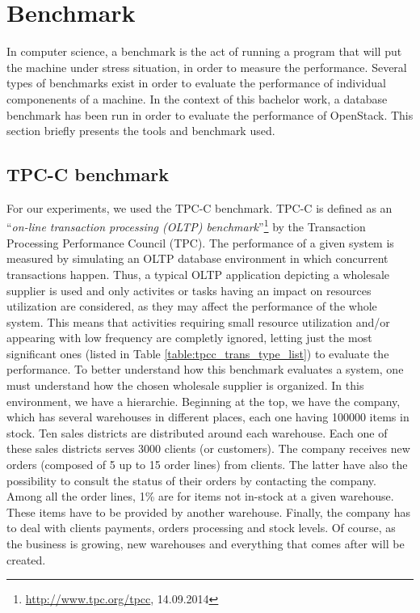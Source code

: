 

\chapter{Benchmark}
In computer science, a benchmark is the act of running a program that will put the machine under stress situation, in order to measure the performance. 
Several types of benchmarks exist in order to evaluate the performance of individual componenents of a machine. 
In the context of this bachelor work, a database benchmark has been run in order to evaluate the performance of OpenStack.
This section briefly presents the tools and benchmark used.

\section{TPC-C benchmark}
For our experiments, we used the TPC-C benchmark. 
TPC-C is defined as an \enquote{\textit{on-line transaction processing (OLTP) benchmark}}\footnote{\url{http://www.tpc.org/tpcc}, 14.09.2014} by the Transaction Processing Performance Council (TPC).
The performance of a given system is measured by simulating an OLTP database environment in which concurrent transactions happen.
Thus, a typical OLTP application depicting a wholesale supplier is used 
and only activites or tasks having an impact on resources utilization are considered, as they may affect the performance of the whole system.
This means that activities requiring small resource utilization and/or appearing with low frequency are completly ignored, 
letting just the most significant ones (listed in Table \ref{table:tpcc_trans_type_list}) to evaluate the performance.
To better understand how this benchmark evaluates a system, one must understand how the chosen wholesale supplier is organized.
In this environment, we have a hierarchie. 
Beginning at the top, we have the company, which has several warehouses in different places, each one having 100000 items in stock.
Ten sales districts are distributed around each warehouse.
Each one of these sales districts serves 3000 clients (or customers).
The company receives new orders (composed of 5 up to 15 order lines) from clients.
The latter have also the possibility to consult the status of their orders by contacting the company.
Among all the order lines, 1\% are for items not in-stock at a given warehouse.
These items have to be provided by another warehouse.
Finally, the company has to deal with clients payments, orders processing and stock levels.
Of course, as the business is growing, new warehouses and everything that comes after will be created.

